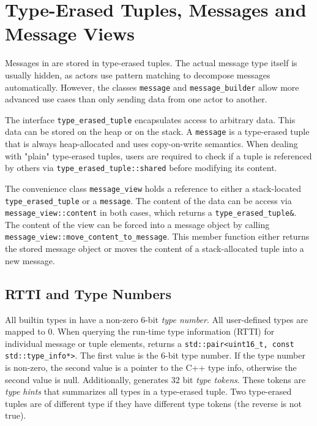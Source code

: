 \section{Type-Erased Tuples, Messages and Message Views}
\label{message}

Messages in \lib are stored in type-erased tuples.
The actual message type itself is usually hidden, as actors use pattern matching to decompose messages automatically.
However, the classes \lstinline^message^ and \lstinline^message_builder^ allow more advanced use cases than only sending data from one actor to another.

The interface \lstinline^type_erased_tuple^ encapsulates access to arbitrary data. This data can be stored on the heap or on the stack. A \lstinline^message^ is a type-erased tuple that is always heap-allocated and uses copy-on-write semantics. When dealing with "plain" type-erased tuples, users are required to check if a tuple is referenced by others via \lstinline^type_erased_tuple::shared^ before modifying its content.

The convenience class \lstinline^message_view^ holds a reference to either a stack-located \lstinline^type_erased_tuple^ or a \lstinline^message^. The content of the data can be access via \lstinline^message_view::content^ in both cases, which returns a \lstinline^type_erased_tuple&^. The content of the view can be forced into a message object by calling \lstinline^message_view::move_content_to_message^. This member function either returns the stored message object or moves the content of a stack-allocated tuple into a new message.

\subsection{RTTI and Type Numbers}

All builtin types in \lib have a non-zero 6-bit \emph{type number}. All user-defined types are mapped to 0. When querying the run-time type information (RTTI) for individual message or tuple elements, \lib returns a \lstinline^std::pair<uint16_t, const std::type_info*>^. The first value is the 6-bit type number. If the type number is non-zero, the second value is a pointer to the C++ type info, otherwise the second value is null. Additionally, \lib generates 32 bit \emph{type tokens}. These tokens are \emph{type hints} that summarizes all types in a type-erased tuple. Two type-erased tuples are of different type if they have different type tokens (the reverse is not true).

